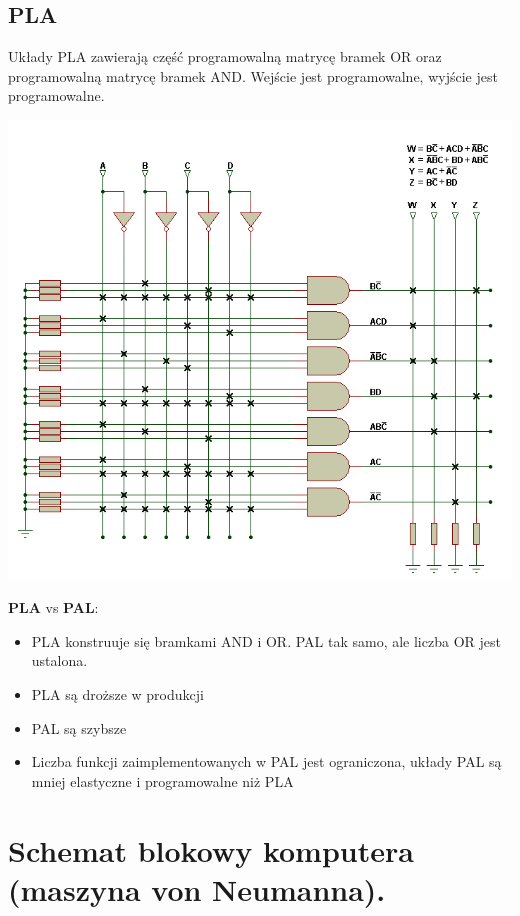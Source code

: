 \documentclass[12pt]{article}
\begin{document}
    \subsection{PLA}
        Układy PLA zawierają część programowalną matrycę bramek OR oraz programowalną
        matrycę bramek AND.
        Wejście jest programowalne, wyjście jest programowalne.
       \begin{center}
         \includegraphics[scale=0.7]{graphics/pla.png}
        \end{center}

        \textbf{PLA} vs \textbf{PAL}:
        \begin{itemize}
            \item PLA konstruuje się bramkami AND i OR. PAL tak samo, ale liczba
            OR jest ustalona.
            \item PLA są droższe w produkcji
            \item PAL są szybsze
            \item Liczba funkcji zaimplementowanych w PAL jest ograniczona,
            układy PAL są mniej elastyczne i programowalne niż PLA
        \end{itemize}
    \newpage

    \section{Schemat blokowy komputera (maszyna von Neumanna).}
\end{document}

